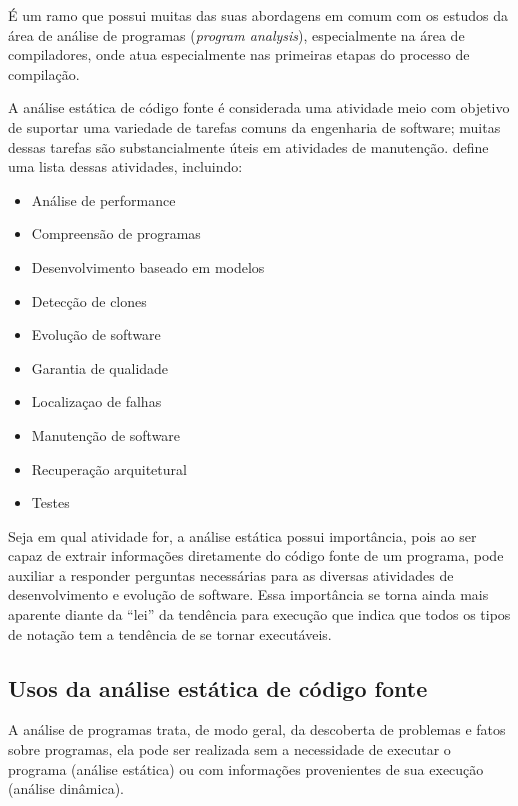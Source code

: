 É um ramo que possui muitas das suas abordagens em comum com os estudos da
área de análise de programas ({\it program analysis}), especialmente na área de
compiladores, onde atua especialmente nas primeiras etapas do processo de compilação.

A análise estática de código fonte é considerada uma atividade meio com
objetivo de suportar uma variedade de tarefas comuns da engenharia de
software; muitas dessas tarefas são substancialmente úteis em atividades de
manutenção.  define uma lista dessas
atividades, incluindo:

\begin{multicols}{2}
  \begin{itemize}
    \item Análise de performance
    \item Compreensão de programas
    \item Desenvolvimento baseado em modelos
    \item Detecção de clones
    \item Evolução de software
    \item Garantia de qualidade
    \item Localizaçao de falhas
    \item Manutenção de software
    \item Recuperação arquitetural
    \item Testes
  \end{itemize}
\end{multicols}

Seja em qual atividade for, a análise estática possui importância,
pois ao ser capaz de extrair informações diretamente do
código fonte de um programa, pode auxiliar a responder perguntas necessárias
para as diversas atividades de desenvolvimento e evolução de software. Essa
importância se torna ainda mais aparente diante da ``lei'' da tendência para
execução \cite{Harman2010} que indica que todos os tipos de notação tem a
tendência de se tornar executáveis.

\subsection{Usos da análise estática de código fonte} \label{usos}

A análise de programas trata, de modo geral, da descoberta de problemas e
fatos sobre programas, ela pode ser realizada sem a necessidade de executar o
programa (análise estática) ou com informações provenientes de sua execução
(análise dinâmica).

